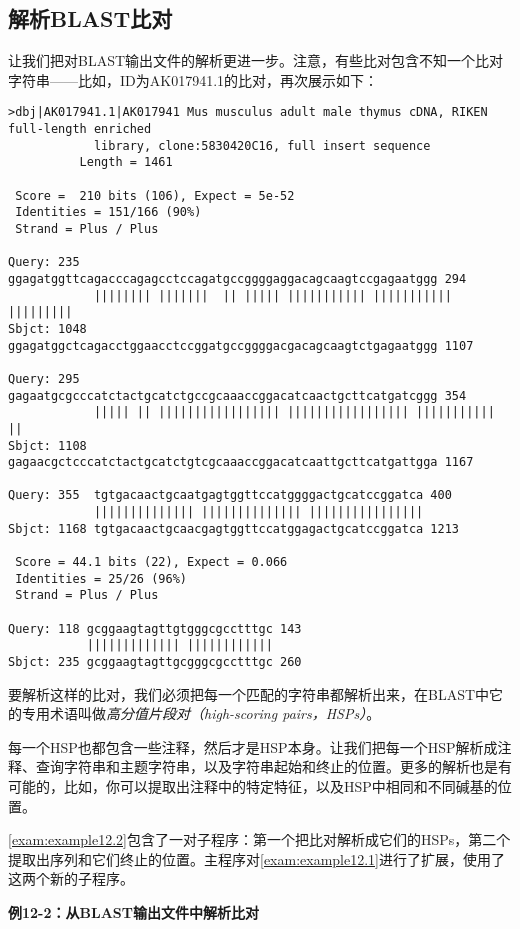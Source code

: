 \subsection{解析BLAST比对}
让我们把对BLAST输出文件的解析更进一步。注意，有些比对包含不知一个比对字符串——比如，ID为AK017941.1的比对，再次展示如下：

\begin{lstlisting}
>dbj|AK017941.1|AK017941 Mus musculus adult male thymus cDNA, RIKEN
full-length enriched
            library, clone:5830420C16, full insert sequence
          Length = 1461

 Score =  210 bits (106), Expect = 5e-52
 Identities = 151/166 (90%)
 Strand = Plus / Plus

Query: 235  ggagatggttcagacccagagcctccagatgccggggaggacagcaagtccgagaatggg 294
            |||||||| |||||||  || ||||| ||||||||||| ||||||||||| |||||||||
Sbjct: 1048 ggagatggctcagacctggaacctccggatgccggggacgacagcaagtctgagaatggg 1107

Query: 295  gagaatgcgcccatctactgcatctgccgcaaaccggacatcaactgcttcatgatcggg 354
            ||||| || ||||||||||||||||| ||||||||||||||||| ||||||||||| ||
Sbjct: 1108 gagaacgctcccatctactgcatctgtcgcaaaccggacatcaattgcttcatgattgga 1167

Query: 355  tgtgacaactgcaatgagtggttccatggggactgcatccggatca 400
            |||||||||||||| |||||||||||||| ||||||||||||||||
Sbjct: 1168 tgtgacaactgcaacgagtggttccatggagactgcatccggatca 1213

 Score = 44.1 bits (22), Expect = 0.066
 Identities = 25/26 (96%)
 Strand = Plus / Plus

Query: 118 gcggaagtagttgtgggcgcctttgc 143
           ||||||||||||| ||||||||||||
Sbjct: 235 gcggaagtagttgcgggcgcctttgc 260
\end{lstlisting}

要解析这样的比对，我们必须把每一个匹配的字符串都解析出来，在BLAST中它的专用术语叫做\textit{高分值片段对（high-scoring pairs，HSPs）}。

每一个HSP也都包含一些注释，然后才是HSP本身。让我们把每一个HSP解析成注释、查询字符串和主题字符串，以及字符串起始和终止的位置。更多的解析也是有可能的，比如，你可以提取出注释中的特定特征，以及HSP中相同和不同碱基的位置。

\autoref{exam:example12.2}包含了一对子程序：第一个把比对解析成它们的HSPs，第二个提取出序列和它们终止的位置。主程序对\autoref{exam:example12.1}进行了扩展，使用了这两个新的子程序。

\textbf{例12-2：从BLAST输出文件中解析比对}


